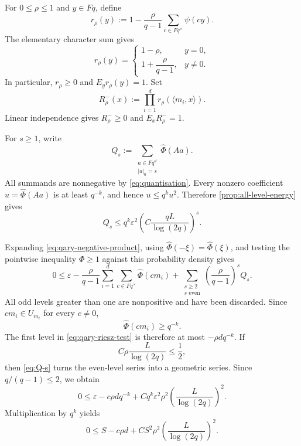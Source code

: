 \documentclass[11pt,reqno]{amsart}
\numberwithin{equation}{section}
\theoremstyle{definition}
\theoremstyle{remark}
\newcommand{\Fq}{\mathbb F_q}
\newcommand{\E}{\mathbb E}
\newcommand{\eps}{\varepsilon}
\newcommand{\wh}{\widehat}
\newcommand{\angles}[1]{\langle#1\rangle}
\def\Fq{Fq}%
\def\mathbb#1{#1}%
\begin{document}
For $0\le\rho\le1$ and $y\in\Fq$, define
\begin{equation}\label{eq:qary-one-coordinate-negative}
 r_\rho(y)
 :=1-\frac{\rho}{q-1}
 \sum_{c\in\Fq^\times}\psi(cy).
\end{equation}
The elementary character sum gives
\begin{equation}\label{eq:qary-one-coordinate-values}
 r_\rho(y)=
 \begin{cases}
  1-\rho,&y=0,\\[1mm]
  1+\dfrac{\rho}{q-1},&y\ne0.
 \end{cases}
\end{equation}
In particular, $r_\rho\ge0$ and $\E_y r_\rho(y)=1$.  Set
\begin{equation}\label{eq:qary-negative-product}
 R_\rho^-(x)
 :=\prod_{i=1}^d
 r_\rho(\angles{m_i,x}).
\end{equation}
Linear independence gives
$R_\rho^-\ge0$ and $\E_xR_\rho^-=1$.

For $s\ge1$, write
\begin{equation}\label{eq:Qs-def}
 Q_s
 :=\sum_{\substack{a\in\Fq^d\\|a|_0=s}}
 \wh\Phi(Aa).
\end{equation}
All summands are nonnegative by \eqref{eq:quantisation}.  Every nonzero coefficient
$u=\wh\Phi(Aa)$ is at least $q^{-k}$, and hence
$u\le q^ku^2$.  Therefore \cref{prop:all-level-energy} gives
\begin{equation}\label{eq:Q-s}
 Q_s
 \le
 q^k\eps^2
 \left(
   C\frac{qL}{\log(2q)}
 \right)^s.
\end{equation}

Expanding \eqref{eq:qary-negative-product}, using
$\wh\Phi(-\xi)=\wh\Phi(\xi)$, and testing the pointwise inequality
$\Phi\ge1$ against this probability density gives
\begin{equation}\label{eq:qary-riesz-test}
 0\le
 \eps
 -\frac{\rho}{q-1}
 \sum_{i=1}^d\sum_{c\in\Fq^\times}
 \wh\Phi(cm_i)
 +\sum_{\substack{s\ge2\\s\text{ even}}}
 \left(\frac{\rho}{q-1}\right)^sQ_s.
\end{equation}
All odd levels greater than one are nonpositive and have been discarded.  Since
$cm_i\in U_{m_i}$ for every $c\ne0$,
\[
 \wh\Phi(cm_i)\ge q^{-k}.
\]
The first level in \eqref{eq:qary-riesz-test} is therefore at most
$-\rho dq^{-k}$.  If
\begin{equation}\label{eq:qary-rho-condition}
 C\rho\frac{L}{\log(2q)}\le\frac12,
\end{equation}
then \eqref{eq:Q-s} turns the even-level series into a geometric series.  Since $q/(q-1)\le2$, we obtain
\begin{equation}\label{eq:master-eps}
 0\le
 \eps-c\rho dq^{-k}
 +Cq^k\eps^2\rho^2
 \left(\frac{L}{\log(2q)}\right)^2.
\end{equation}
Multiplication by $q^k$ yields
\begin{equation}\label{eq:master-S}
 0\le
 S-c\rho d
 +CS^2\rho^2
 \left(\frac{L}{\log(2q)}\right)^2.
\end{equation}
\end{document}
